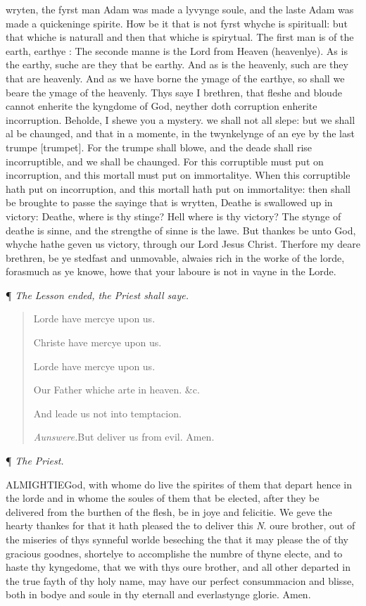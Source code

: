 wryten, the fyrst man Adam was made a lyvynge soule, and the laste Adam
was made a quickeninge spirite. How be it that is not fyrst whyche is
spirituall: but that whiche is naturall and then that whiche is spirytual.
The first man is of the earth, earthye : The seconde manne is the Lord
from Heaven (heavenlye). As is the earthy, suche are they that be earthy.
And as is the heavenly, such are they that are heavenly. And as we have
borne the ymage of the earthye, so shall we beare the ymage of the heavenly.
Thys saye I brethren, that fleshe and bloude cannot enherite the kyngdome
of God, neyther doth corruption enherite incorruption. Beholde, I shewe
you a mystery. we shall not all slepe: but we shall al be chaunged, and
that in a momente, in the twynkelynge of an eye by the last trumpe [trumpet].
For the trumpe shall blowe, and the deade shall rise incorruptible, and
we shall be chaunged. For this corruptible must put on incorruption, and
this mortall must put on immortalitye. When this corruptible hath put
on incorruption, and this mortall hath put on immortalitye: then shall
be broughte to passe the sayinge that is wrytten, Deathe is swallowed
up in victory: Deathe, where is thy stinge? Hell where is thy victory?
The stynge of deathe is sinne, and the strengthe of sinne is the lawe.
But thankes be unto God, whyche hathe geven us victory, through our Lord
Jesus Christ. Therfore my deare brethren, be ye stedfast and unmovable,
alwaies rich in the worke of the lorde, forasmuch as ye knowe, howe that
your laboure is not in vayne in the Lorde.

¶
\emph{The Lesson ended, the Priest shall saye.}

\begin{quote}

Lorde have mercye
upon us.

Christe have mercye upon us.

Lorde have mercye upon us.

Our Father whiche arte in heaven. \&c.

And leade us not into temptacion.

\emph{Aunswere.}But deliver us from evil. Amen.

\end{quote}

¶
\emph{The Priest.}

ALMIGHTIE\textbf{}God, with whome do live the spirites of them that depart hence in
the lorde and in whome the soules of them that be elected, after they
be delivered from the burthen of the flesh, be in joye and felicitie.
We geve the hearty thankes for that it hath pleased the to deliver this
\emph{N}. oure brother, out of the miseries of thys synneful worlde beseching
the that it may please the of thy gracious goodnes, shortelye to accomplishe
the numbre of thyne electe, and to haste thy kyngedome, that we with thys
oure brother, and all other departed in the true fayth of thy holy name,
may have our perfect consummacion and blisse, both in bodye and soule
in thy eternall and everlastynge glorie. Amen.

